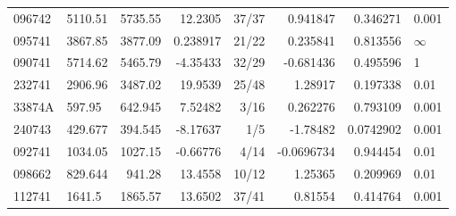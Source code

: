 \begin{longtable}{llrrrrrl}
096742 & 5110.51 & 5735.55 & 12.2305 & 37/37 & 0.941847 & 0.346271 & 0.001 \\

095741 & 3867.85 & 3877.09 & 0.238917 & 21/22 & 0.235841 & 0.813556 & $\infty$ \\

090741 & 5714.62 & 5465.79 & -4.35433 & 32/29 & -0.681436 & 0.495596 & 1 \\

232741 & 2906.96 & 3487.02 & 19.9539 & 25/48 & 1.28917 & 0.197338 & 0.01 \\

33874A & 597.95 & 642.945 & 7.52482 & 3/16 & 0.262276 & 0.793109 & 0.001 \\

240743 & 429.677 & 394.545 & -8.17637 & 1/5 & -1.78482 & 0.0742902 & 0.001 \\

092741 & 1034.05 & 1027.15 & -0.66776 & 4/14 & -0.0696734 & 0.944454 & 0.01 \\

098662 & 829.644 & 941.28 & 13.4558 & 10/12 & 1.25365 & 0.209969 & 0.01 \\

112741 & 1641.5 & 1865.57 & 13.6502 & 37/41 & 0.81554 & 0.414764 & 0.001 \\

\end{longtable}\endgroup

\begingroup\footnotesize\setlength{\tabcolsep}{3pt}

